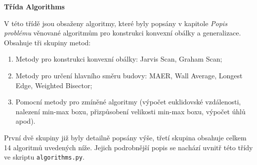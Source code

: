 \bigbreak

\par {\large\textbf{Třída Algorithms} }
\par V této třídě jsou obsaženy algoritmy, které byly popsány v kapitole \emph{Popis problému} věnované algoritmům pro konstrukci konvexní obálky a generalizace. Obsahuje tři skupiny metod: 

\begin{enumerate}
    \item Metody pro konstrukci konvexní obálky: Jarvis Scan, Graham Scan;
    \item Metody pro určení hlavního směru budovy: MAER, Wall Average, Longest Edge, Weighted Bisector;
    \item Pomocní metody pro zmíněné algoritmy (výpočet euklidovské vzdálenosti, nalezení min-max boxu, přizpůsobení velikosti min-max boxu, výpočet úhlů apod).
\end{enumerate}
\par První dvě skupiny již byly detailně popsány výše, třetí skupina obsahuje celkem 14 algoritmů uvedených níže. Jejich podrobnější popis se nachází uvnitř této třídy ve skriptu \verb|algorithms.py|.

